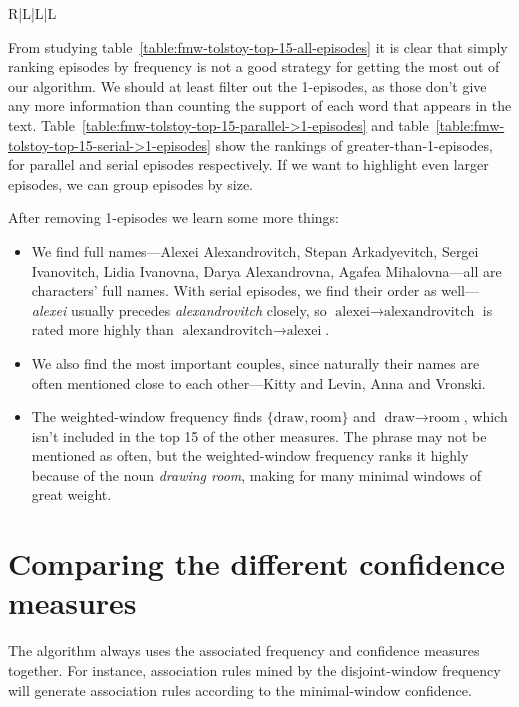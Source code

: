 \begin{table}
\begin{tabulary}{\textwidth}{R|L|L|L}
\end{tabulary}

\caption{The top 15 serial episodes found by our algorithm, excluding 1-episodes, with $ \rho = 15 $, and for the three frequency measures.}
\label{table:fmw-tolstoy-top-15-serial->1-episodes}
\end{table}

From studying table~\ref{table:fmw-tolstoy-top-15-all-episodes} it is clear that simply ranking episodes by frequency is not a good strategy for getting the most out of our algorithm. We should at least filter out the 1-episodes, as those don't give any more information than counting the support of each word that appears in the text. Table~\ref{table:fmw-tolstoy-top-15-parallel->1-episodes} and table~\ref{table:fmw-tolstoy-top-15-serial->1-episodes} show the rankings of greater-than-1-episodes, for parallel and serial episodes respectively. If we want to highlight even larger episodes, we can group episodes by size.

After removing 1-episodes we learn some more things:
\begin{itemize}
\item We find full names---Alexei Alexandrovitch, Stepan Arkadyevitch, Sergei Ivanovitch, Lidia Ivanovna, Darya Alexandrovna, Agafea Mihalovna---all are characters' full names. With serial episodes, we find their order as well---\emph{alexei} usually precedes \emph{alexandrovitch} closely, so $ \text{alexei} \to \text{alexandrovitch} $ is rated more highly than $ \text{alexandrovitch} \to \text{alexei} $.
\item We also find the most important couples, since naturally their names are often mentioned close to each other---Kitty and Levin, Anna and Vronski.
\item The weighted-window frequency finds $ \{ \text{draw}, \text{room} \} $ and $ \text{draw} \to \text{room} $, which isn't included in the top 15 of the other measures. The phrase may not be mentioned as often, but the weighted-window frequency ranks it highly because of the noun \emph{drawing room}, making for many minimal windows of great weight.
\end{itemize}

\section{Comparing the different confidence measures}

The algorithm always uses the associated frequency and confidence measures together. For instance, association rules mined by the disjoint-window frequency will generate association rules according to the minimal-window confidence.

